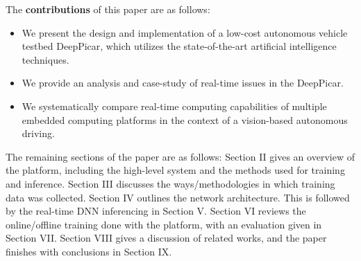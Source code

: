
The {\bf contributions} of this paper are as follows:
\begin{itemize}
  \item We present the design and implementation of a
    low-cost autonomous vehicle testbed DeepPicar, which utilizes the
    state-of-the-art artificial intelligence techniques.
  \item We provide an analysis and case-study of real-time issues in the
    DeepPicar.
  \item We systematically compare real-time computing capabilities of
    multiple embedded computing platforms in the context of a
    vision-based autonomous driving.
\end{itemize}




The remaining sections of the paper are as follows: Section II gives
an overview of the platform, including the high-level system and the
methods used for training and inference. Section III discusses the
ways/methodologies in which training data was collected. Section IV
outlines the network architecture. This is followed by the real-time
DNN inferencing in Section V. Section VI reviews the online/offline
training done with the platform, with an evaluation given in Section
VII. Section VIII gives a discussion of related works, and the paper
finishes with conclusions in Section IX.


